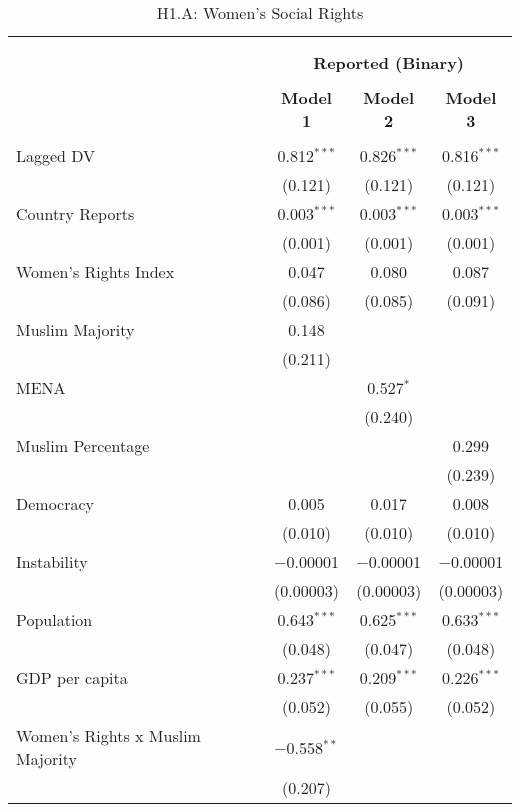 
\begin{table}[!htbp] \centering 
  \caption{H1.A: Women's Social Rights} 
  \label{} 
\begin{tabular}{@{\extracolsep{5pt}}lccc} 
\\[-1.8ex]\hline \\[-1.8ex] 
\\[-1.8ex] & \multicolumn{3}{c}{\textbf{Reported (Binary)}} \\ 
\\[-1.8ex] & \textbf{Model 1} & \textbf{Model 2} & \textbf{Model 3}\\ 
\hline \\[-1.8ex] 
 Lagged DV & 0.812$^{***}$ & 0.826$^{***}$ & 0.816$^{***}$ \\ 
  & (0.121) & (0.121) & (0.121) \\ 
  Country Reports & 0.003$^{***}$ & 0.003$^{***}$ & 0.003$^{***}$ \\ 
  & (0.001) & (0.001) & (0.001) \\ 
  Women's Rights Index & 0.047 & 0.080 & 0.087 \\ 
  & (0.086) & (0.085) & (0.091) \\ 
  Muslim Majority & 0.148 &  &  \\ 
  & (0.211) &  &  \\ 
  MENA &  & 0.527$^{*}$ &  \\ 
  &  & (0.240) &  \\ 
  Muslim Percentage &  &  & 0.299 \\ 
  &  &  & (0.239) \\ 
  Democracy & 0.005 & 0.017 & 0.008 \\ 
  & (0.010) & (0.010) & (0.010) \\ 
  Instability & $-$0.00001 & $-$0.00001 & $-$0.00001 \\ 
  & (0.00003) & (0.00003) & (0.00003) \\ 
  Population & 0.643$^{***}$ & 0.625$^{***}$ & 0.633$^{***}$ \\ 
  & (0.048) & (0.047) & (0.048) \\ 
  GDP per capita & 0.237$^{***}$ & 0.209$^{***}$ & 0.226$^{***}$ \\ 
  & (0.052) & (0.055) & (0.052) \\ 
  Women's Rights x Muslim Majority & $-$0.558$^{**}$ &  &  \\ 
  & (0.207) &  &  \\ 

\end{tabular}
\end{table}
